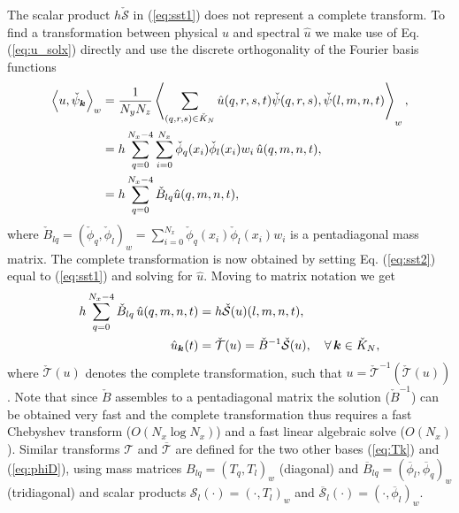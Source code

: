 \documentclass[11pt, oneside]{article}
\newcommand{\N}[1]{\check{#1}}
\newcommand{\D}[1]{\overline{#1}}
\begin{document}
The scalar product  $h\N{\mathcal{S}}$ in (\ref{eq:sst1}) does not represent a 
complete transform. To find a transformation between physical $u$ and spectral 
$\hat{u}$ we make use of Eq. (\ref{eq:u_solx}) directly and use the discrete 
orthogonality of the Fourier basis functions
\begin{align}
\left<u, \N{\psi}_{\bm{k}}\right>_w &= \frac{1}{N_yN_z}\left< 
\sum_{(q,r,s) \in \N{K}_N} \hat{u}(q,r,s,t) \N{\psi}(q,r,s), 
\N{\psi}(l,m,n,t) \right>_w, \notag \\
           &= h \sum_{q=0}^{N_x-4} \sum_{i=0}^{N_x} \N{\phi}_{q}(x_i) 
           \N{\phi}_{l}(x_i) w_i \, \hat{u}(q, {m}, {n}, t), \notag \\
           &= h \sum_{q=0}^{N_x-4} \N{B}_{lq} \hat{u}(q, {m}, {n}, t), 
           \label{eq:sst2}
\end{align}
where $\N{B}_{lq} = (\N{\phi}_q, \N{\phi}_l)_w = 
\sum_{i=0}^{N_x} \N{\phi}_{q}(x_i) \N{\phi}_{l}(x_i) w_i$ is a 
pentadiagonal mass matrix. The complete transformation is now obtained by 
setting Eq. (\ref{eq:sst2}) equal to (\ref{eq:sst1}) and solving for $\hat{u}$. 
Moving to matrix notation we get
\begin{align}
h\sum_{q=0}^{N_x-4} \N{B}_{lq}\, \hat{u}(q, {m}, {n}, t) &= 
h\N{\mathcal{S}}(u)(l, m, n, t), \notag \\
 \hat{u}_{\bm{k}}(t) &= \N{\mathcal{T}}(u) =  \N{B}^{-1}\N{\mathcal{S}}(u), 
 \quad \forall \, \bm{k} \in \N{K}_N, \label{eq:fstB}
\end{align}
where $\N{\mathcal{T}}(u)$ denotes the complete transformation, such that $u = 
\N{\mathcal{T}}^{-1}(\N{\mathcal{T}}(u))$. Note that since $\N{B}$ assembles to 
a pentadiagonal matrix the solution ($\N{B}^{-1}$) can be obtained very fast 
and 
the complete 
transformation thus requires a fast Chebyshev transform ($O(N_x \log N_x)$) and 
a fast linear algebraic solve ($O(N_x)$). Similar transforms $\mathcal{T}$ 
and $\D{\mathcal{T}}$ are defined for the two other bases (\ref{eq:Tk}) and 
(\ref{eq:phiD}), using mass matrices $B_{lq}=(T_q, T_l)_w$ (diagonal) and 
$\D{B}_{lq}=(\D{\phi}_l, \D{\phi}_q)_w$ (tridiagonal) and scalar products 
$\mathcal{S}_l(\cdot) = (\cdot, T_l)_w$ and $\D{\mathcal{S}}_l(\cdot) = (\cdot, 
\D{\phi}_l)_w$.
\end{document}
